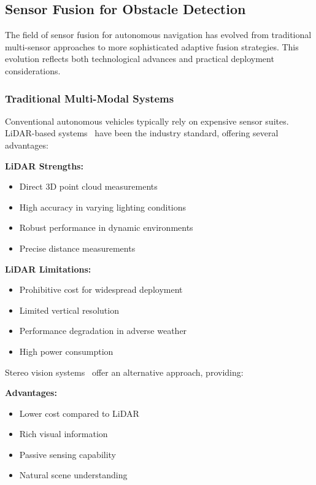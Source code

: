 \documentclass[12pt,oneside]{book}
\begin{document}
\subsection{Sensor Fusion for Obstacle Detection}

The field of sensor fusion for autonomous navigation has evolved from traditional multi-sensor approaches to more sophisticated adaptive fusion strategies. This evolution reflects both technological advances and practical deployment considerations.

\subsubsection{Traditional Multi-Modal Systems}
Conventional autonomous vehicles typically rely on expensive sensor suites. LiDAR-based systems~\cite{geiger2012we} have been the industry standard, offering several advantages:

\textbf{LiDAR Strengths:}
\begin{itemize}
    \item Direct 3D point cloud measurements
    \item High accuracy in varying lighting conditions
    \item Robust performance in dynamic environments
    \item Precise distance measurements
\end{itemize}

\textbf{LiDAR Limitations:}
\begin{itemize}
    \item Prohibitive cost for widespread deployment
    \item Limited vertical resolution
    \item Performance degradation in adverse weather
    \item High power consumption
\end{itemize}

Stereo vision systems~\cite{menze2015joint} offer an alternative approach, providing:

\textbf{Advantages:}
\begin{itemize}
    \item Lower cost compared to LiDAR
    \item Rich visual information
    \item Passive sensing capability
    \item Natural scene understanding
\end{itemize}
\end{document}
